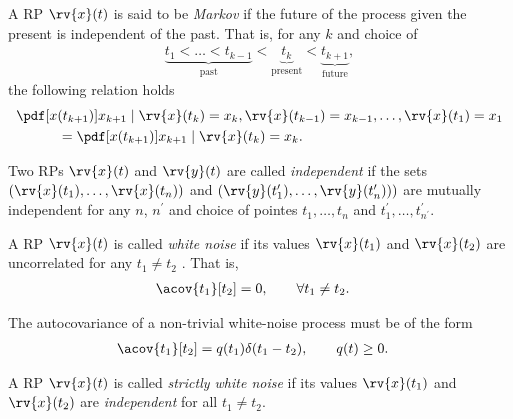 \begin{mydefinition}[Markov RP]
    A RP $\rv{x}(t)$ is said to be \emph{Markov} if the future of the process given the present is independent of the past. That is, for any $k$ and choice of 
    \begin{align}
        \underbrace{t_{1} < \ldots < t_{k-1}}_{\text{past}} < \underbrace{t_{k}}_{\text{present}} < \underbrace{t_{k+1}}_{\text{future}},
    \end{align}
    the following relation holds
    \begin{align}
        &\pdf[x(t_{k+1})]{x_{k+1}\mid \rv{x}(t_{k})=x_{k}, \rv{x}(t_{k-1})=x_{k-1}, \ldots, \rv{x}(t_{1})=x_{1}}\\
        &\qquad\quad= \pdf[x(t_{k+1})]{x_{k+1} \mid \rv{x}(t_{k})=x_{k}}.
    \end{align}
\end{mydefinition}
%
\begin{mydefinition}
  Two RPs $\rv{x}(t)$ and $\rv{y}(t)$ are called \emph{independent} if the sets $(\rv{x}(t_{1}), \ldots, \rv{x}(t_{n}) )$ and $\left( \rv{y}(t_{1}^{\prime}), \ldots, \rv{y}(t_{n}^{\prime}) \right))$ are mutually independent for any $n$, $n^{\prime}$ and choice of pointes $t_{1}, \ldots, t_{n}$ and $t^{\prime}_{1}, \ldots, t^{\prime}_{n^{\prime}}$.
\end{mydefinition}

\begin{mydefinition}
    A RP $\rv{x}(t)$ is called \emph{white noise} if its values $\rv{x}(t_{1})$ and $\rv{x}(t_{2})$ are uncorrelated for any $t_{1}\neq t_{2}$ . That is,
    \begin{align}
        \acov{t_{1}}[t_{2}] &= 0, \qquad \forall t_{1}\neq t_{2}.
    \end{align}
\end{mydefinition}
\begin{myremark}
    The autocovariance of a non-trivial white-noise process must be of the form
    \begin{align}
        \acov{t_{1}}[t_{2}] &= q(t_{1})\delta (t_{1} - t_{2}), \qquad q(t)\geq 0.
    \end{align}
\end{myremark}

\begin{mydefinition}
    A RP $\rv{x}(t)$ is called \emph{strictly white noise} if its values $\rv{x}(t_{1})$ and $\rv{x}(t_{2})$ are \emph{independent} for all $t_{1}\neq t_{2}$.
\end{mydefinition}

